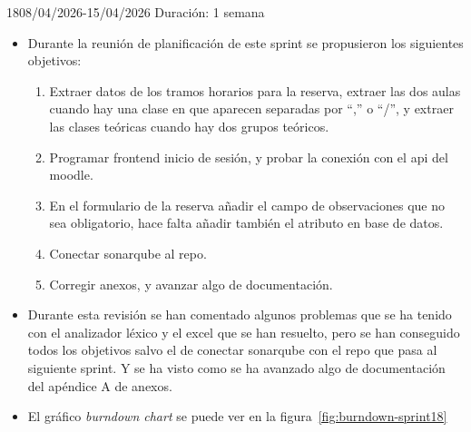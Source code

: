 \begin{Sprint}{18}{08/04/2026-15/04/2026}
	Duración: 1 semana
	\begin{itemize}	
		\item{}
		Durante la reunión de planificación de este sprint se propusieron los siguientes objetivos:
		\begin{enumerate}
			\item Extraer datos de los tramos horarios para la reserva, extraer las dos aulas cuando hay una clase en que aparecen separadas por ``,'' o ``/'', y extraer las clases teóricas cuando hay dos grupos teóricos.
			\item Programar frontend inicio de sesión, y probar la conexión con el api del moodle.
			\item En el formulario de la reserva añadir el campo de observaciones que no sea obligatorio, hace falta añadir también el atributo en base de datos.
			\item Conectar sonarqube al repo.
			\item Corregir anexos, y avanzar algo de documentación.
		\end{enumerate}
		\item{}
		Durante esta revisión se han comentado algunos problemas que se ha tenido con el analizador léxico y el excel que se han resuelto, pero se han conseguido todos los objetivos salvo el de conectar sonarqube con el repo que pasa al siguiente sprint. Y se ha visto como se ha avanzado algo de documentación del apéndice A de anexos.
		
		\item{}
		El gráfico \textit{burndown chart} se puede ver en la figura~\ref{fig:burndown-sprint18}
	\end{itemize}
\end{Sprint}

